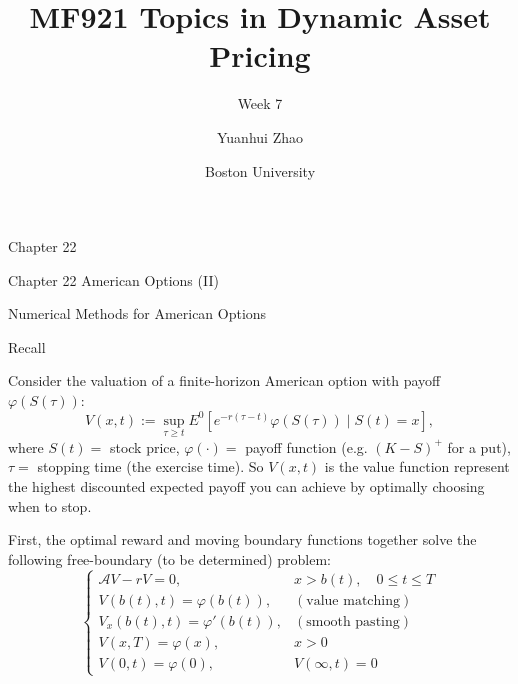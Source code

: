 \documentclass{beamer}
\title{MF921 Topics in Dynamic Asset Pricing}
\subtitle{Week 7}
\author{Yuanhui Zhao}
\date{Boston University}
\begin{document}
\frame{\titlepage}

\begin{frame}{Chapter 22}

    {
    \begin{center}
        Chapter 22 American Options (II)
    \end{center}
    \begin{center}
        Numerical Methods for American Options
    \end{center}
    }
    
\end{frame}

\begin{frame}{Recall}

    {\footnotesize \footnotesize
    Consider the valuation of a finite-horizon American option with payoff $\varphi(S(\tau))$:
    \[
    V(x,t) := \sup_{\tau \geq t} E^0 \left[ e^{-r(\tau - t)} \varphi(S(\tau)) \mid S(t) = x \right],
    \]
     where \( S(t) = \) stock price, \(\varphi(\cdot) = \) payoff function (e.g. \((K - S)^+\) for 
    a put), \(\tau = \) stopping time (the exercise time). So \( V(x,t) \) is the value function
    represent the highest discounted expected payoff you can achieve by optimally choosing when to stop.
    \vspace{1em}

     \pause First, the optimal reward and moving boundary functions together solve the
    following free-boundary (to be determined) problem:
        \[
        \begin{cases}
        \mathcal{A} V - rV = 0, & x > b(t), \quad 0 \leq t \leq T\\
        V(b(t), t) = \varphi(b(t)), & (\text{value matching}) \\
        V_x(b(t), t) = \varphi'(b(t)), & (\text{smooth pasting}) \\
        V(x, T) = \varphi(x), & x > 0 \\
        V(0, t) = \varphi(0), & V(\infty, t) = 0
        \end{cases}
        \]
    }
    
\end{frame}
\end{document}
